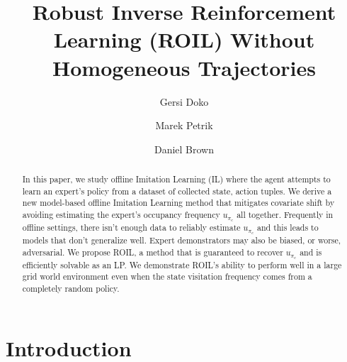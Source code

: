 \documentclass[11pt]{uai2023}
\title{Robust Inverse Reinforcement Learning (ROIL) Without Homogeneous Trajectories}
\author[1]{Gersi Doko}
\author[1]{Marek Petrik}
\author[2]{Daniel Brown}
\affil[1]{
Computer Science Dept.\\
University of New Hampshire\\
Durham, New Hampshire, USA\\
FIRST.LAST@unh.edu
}
\affil[2]{
}
\begin{document}
\maketitle

\begin{abstract}
  In this paper, we study offline Imitation Learning (IL) where the agent attempts to learn an expert's policy from a dataset of collected state, action tuples. 
  We derive a new model-based offline Imitation Learning method that mitigates covariate shift by avoiding estimating the expert's occupancy frequency $u_{\pi_e}$ all together. 
  Frequently in offline settings, there isn't enough data to reliably estimate $u_{\pi_e}$ and this leads to models that don't generalize well. 
  Expert demonstrators may also be biased, or worse, adversarial.
  We propose ROIL, a method that is guaranteed to recover $u_{\pi_e}$ and is efficiently solvable as an LP. 
  We demonstrate ROIL's ability to perform well in a large grid world environment even when the state visitation frequency comes from a completely random policy.
\end{abstract}

\section{Introduction}
\end{document}
